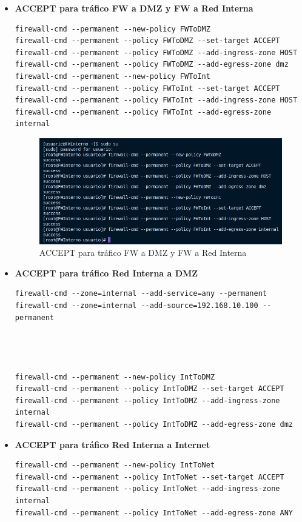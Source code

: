 \documentclass[11pt]{report}
\begin{document}
\begin{itemize}
  \item \textbf{ACCEPT para tráfico FW a DMZ y FW a Red Interna}
  \begin{verbatim}
firewall-cmd --permanent --new-policy FWToDMZ
firewall-cmd --permanent --policy FWToDMZ --set-target ACCEPT
firewall-cmd --permanent --policy FWToDMZ --add-ingress-zone HOST
firewall-cmd --permanent --policy FWToDMZ --add-egress-zone dmz
firewall-cmd --permanent --new-policy FWToInt
firewall-cmd --permanent --policy FWToInt --set-target ACCEPT
firewall-cmd --permanent --policy FWToInt --add-ingress-zone HOST
firewall-cmd --permanent --policy FWToInt --add-egress-zone internal
  \end{verbatim}
  \begin{figure}[H]
    \centering
    \includegraphics[scale=0.65]{img/accept_fw_to_dmz_fw_Int.png}
    \caption{ACCEPT para tráfico FW a DMZ y FW a Red Interna}
    \label{fig:ACCEPT para tráfico FW a DMZ y FW a Red Interna}
  \end{figure}

  \item \textbf{ACCEPT para tráfico Red Interna a DMZ}
  \begin{verbatim}
firewall-cmd --zone=internal --add-service=any --permanent
firewall-cmd --zone=internal --add-source=192.168.10.100 --permanent

    


firewall-cmd --permanent --new-policy IntToDMZ
firewall-cmd --permanent --policy IntToDMZ --set-target ACCEPT
firewall-cmd --permanent --policy IntToDMZ --add-ingress-zone internal
firewall-cmd --permanent --policy IntToDMZ --add-egress-zone dmz
  \end{verbatim}

  \item \textbf{ACCEPT para tráfico Red Interna a Internet}
  \begin{verbatim}
firewall-cmd --permanent --new-policy IntToNet
firewall-cmd --permanent --policy IntToNet --set-target ACCEPT
firewall-cmd --permanent --policy IntToNet --add-ingress-zone internal
firewall-cmd --permanent --policy IntToNet --add-egress-zone ANY
  \end{verbatim}


\end{itemize}
\end{document}
